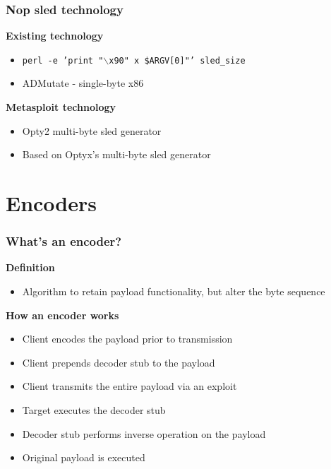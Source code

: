\documentclass{beamer}
\newenvironment{sitemize}{\vspace{1mm}\begin{itemize}\itemsep 4pt\small}{\end{itemize}}
\begin{document}
\begin{frame}[t]
    \frametitle{Nop sled technology}

    \textbf{Existing technology}
    \begin{sitemize}
        \item \footnotesize{\texttt{perl -e 'print "$\backslash$x90" x \$ARGV[0]"'
            sled\_size}}
        \item ADMutate - single-byte x86
    \end{sitemize}

     \textbf{Metasploit technology}
     \begin{sitemize}
         \item Opty2 multi-byte sled generator
          \item Based on Optyx's multi-byte sled generator
     \end{sitemize}
\end{frame}

\section{Encoders}


\begin{frame}[t]
    \frametitle{What's an encoder?}

    \textbf{Definition}
    \begin{sitemize}
        \item Algorithm to retain payload functionality, but alter the byte sequence
    \end{sitemize}

    \pause
    \textbf{How an encoder works}
    \begin{sitemize}
        \pause
        \item Client encodes the payload prior to transmission
        \pause
        \item Client prepends decoder stub to the payload
        \pause
        \item Client transmits the entire payload via an exploit
        \pause
        \item Target executes the decoder stub
        \pause
        \item Decoder stub performs inverse operation on the payload
        \pause
        \item Original payload is executed
    \end{sitemize}
\end{frame}
\end{document}
